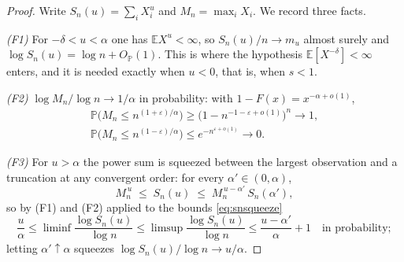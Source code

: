 \documentclass[sn-mathphys-num]{sn-jnl}
\theoremstyle{thmstyleone}%
\theoremstyle{thmstyletwo}%
\theoremstyle{thmstylethree}%
\theoremstyle{thmstyleone}%
\providecommand{\E}{\mathbb{E}}
\providecommand{\Prob}{\mathbb{P}}
\begin{document}
\begin{appendices}
		
		\thmphase*
		
		\begin{proof}
			Write $S_n(u)=\sum_iX_i^u$ and $M_n=\max_iX_i$. We record three
			facts.
			
			\emph{(F1)} For $-\delta<u<\alpha$ one has $\E X^u<\infty$, so
			$S_n(u)/n\to m_u$ almost surely and
			$\log S_n(u)=\log n+O_{\Prob}(1)$. This is where the
			hypothesis $\E[X^{-\delta}]<\infty$ enters, and it is needed
			exactly when $u<0$, that is, when $s<1$.
			
			\emph{(F2)} $\log M_n/\log n\to1/\alpha$ in probability: with
			$1-F(x)=x^{-\alpha+o(1)}$,
			\begin{equation}\label{eq:maxbounds}
				\begin{gathered}
					\Prob\bigl(M_n\le n^{(1+\varepsilon)/\alpha}\bigr)
					\ge\bigl(1-n^{-1-\varepsilon+o(1)}\bigr)^n\to1,\\
					\Prob\bigl(M_n\le n^{(1-\varepsilon)/\alpha}\bigr)
					\le e^{-n^{\varepsilon+o(1)}}\to0 .
				\end{gathered}
			\end{equation}
			
			\emph{(F3)} For $u>\alpha$ the power sum is squeezed between
			the largest observation and a truncation at any convergent
			order: for every $\alpha'\in(0,\alpha)$,
			\begin{equation}\label{eq:snsqueeze}
				M_n^{\,u}\;\le\;S_n(u)\;\le\;
				M_n^{\,u-\alpha'}\,S_n(\alpha') ,
			\end{equation}
			so by (F1) and (F2) applied to the bounds \eqref{eq:snsqueeze}
			\begin{equation}\label{eq:squeeze}
				\frac u\alpha\le\liminf\frac{\log S_n(u)}{\log n}
				\le\limsup\frac{\log S_n(u)}{\log n}
				\le\frac{u-\alpha'}\alpha+1
				\quad\text{in probability};
			\end{equation}
			letting $\alpha'\uparrow\alpha$ squeezes
			$\log S_n(u)/\log n\to u/\alpha$.
			

\end{proof}
\end{appendices}
\end{document}
